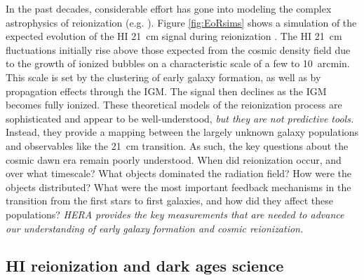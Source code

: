 \documentclass[preprint]{aastex}
\begin{document}
In the past decades, considerable effort has gone into modeling the complex astrophysics of reionization
(e.g. \citealt{shapiro_giroux1987, haiman_loeb1997, furlanetto_et_al2004, santos_et_al2010}). Figure \ref{fig:EoRsims} shows a 
simulation of the expected evolution of the HI 21~cm signal during reionization \citep{mesinger_furlanetto2007}. The HI 21~cm fluctuations initially 
rise above those expected from the cosmic density field due to the growth of ionized bubbles on a characteristic 
scale of a few to 10~arcmin. This scale is set by the clustering of early galaxy formation, as well as by 
propagation effects through the IGM. The signal then declines as the IGM becomes fully ionized.  These theoretical 
models of the reionization process are sophisticated and appear to be well-understood, {\it but they are not 
predictive tools.} Instead, they provide a mapping between the largely unknown galaxy populations and observables 
like the 21~cm transition. As such, the key questions about the cosmic dawn era remain poorly understood.  When 
did reionization occur, and over what timescale?  What objects dominated the radiation field?  How were the 
objects distributed?  What were the most important feedback mechanisms in the transition from the first stars to
first galaxies, and how did they affect these populations?  {\it HERA provides the key measurements that are needed 
to advance our understanding of early galaxy formation and cosmic reionization.}




\subsection{HI reionization and dark ages science} %
\end{document}
